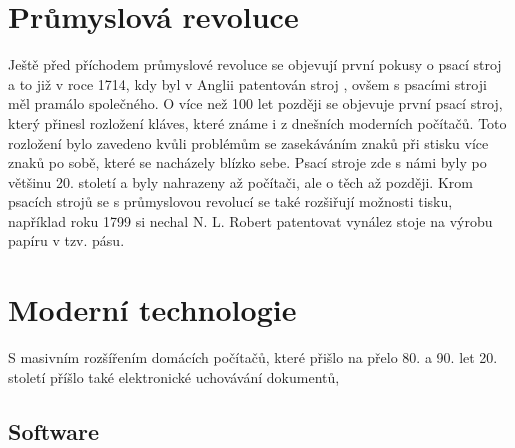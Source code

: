 \section{Průmyslová revoluce}

Ještě před příchodem průmyslové revoluce se objevují první pokusy o psací stroj a to již v roce 1714, kdy byl v Anglii patentován stroj
 \cite{FirstTypewriter}, ovšem s psacími stroji měl pramálo společného. O více než 100 let později se
objevuje první psací stroj, který přinesl rozložení kláves, které známe i z dnešních moderních počítačů. Toto rozložení bylo zavedeno kvůli
problémům se zasekáváním znaků při stisku více znaků po sobě, které se nacházely blízko sebe. Psací stroje zde s námi byly po většinu 20. století
a byly nahrazeny až počítači, ale o těch až později. Krom psacích strojů se s průmyslovou revolucí se také rozšiřují možnosti tisku, například roku 1799
si nechal N. L. Robert patentovat vynález stoje na výrobu papíru v tzv.  pásu. \cite{Papir}

\section{Moderní technologie}

S masivním rozšířením domácích počítačů, které přišlo na přelo 80. a 90. let 20. století příšlo také elektronické uchovávání dokumentů,



\subsection{Software}